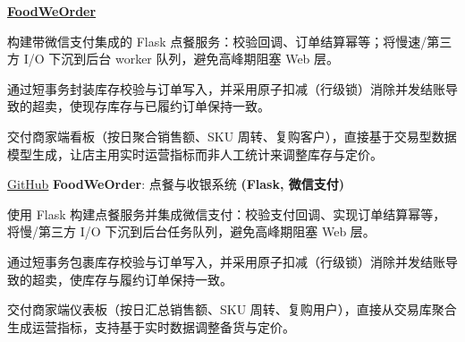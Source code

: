 \begin{twocolentry}{}
\href{https://github.com/faketut/FoodWeOrder}{\textbf{FoodWeOrder}}
\end{twocolentry}
\begin{onecolentry}
\begin{highlights}
\item 构建带微信支付集成的 Flask 点餐服务：校验回调、订单结算幂等；将慢速/第三方 I/O 下沉到后台 worker 队列，避免高峰期阻塞 Web 层。
\item 通过短事务封装库存校验与订单写入，并采用原子扣减（行级锁）消除并发结账导致的超卖，使现存库存与已履约订单保持一致。
\item 交付商家端看板（按日聚合销售额、SKU 周转、复购客户），直接基于交易型数据模型生成，让店主用实时运营指标而非人工统计来调整库存与定价。
\end{highlights}
\end{onecolentry}

\begin{twocolentry}{\hspace{.5pt} \href{https://github.com/faketut/FoodWeOrder}{GitHub}}
    \textbf{FoodWeOrder}: 点餐与收银系统 \textbf{(Flask, 微信支付)}
\end{twocolentry}
\begin{onecolentry}
\begin{highlights}
\item 使用 Flask 构建点餐服务并集成微信支付：校验支付回调、实现订单结算幂等，将慢/第三方 I/O 下沉到后台任务队列，避免高峰期阻塞 Web 层。
\item 通过短事务包裹库存校验与订单写入，并采用原子扣减（行级锁）消除并发结账导致的超卖，使库存与履约订单保持一致。
\item 交付商家端仪表板（按日汇总销售额、SKU 周转、复购用户），直接从交易库聚合生成运营指标，支持基于实时数据调整备货与定价。
\end{highlights}
\end{onecolentry}
